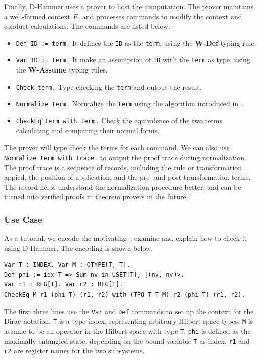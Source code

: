 Finally, D-Hammer uses a prover to host the computation. The prover maintains a well-formed context $E$, and processes commands to modify the context and conduct calculations. The commands are listed below.
\begin{itemize}
    \item \texttt{\textcolor{NavyBlue}{Def} ID := term.} It defines the \texttt{ID} as the \texttt{term}, using the \textbf{W-Def} typing rule.
    \item \texttt{\textcolor{NavyBlue}{Var} ID := term.} It make an assumption of \texttt{ID} with the \texttt{term} as type, using the \textbf{W-Assume} typing rules.
    \item \texttt{\textcolor{NavyBlue}{Check} term.} Type checking the \texttt{term} and output the result.
    \item \texttt{\textcolor{NavyBlue}{Normalize} term.} Normalize the \texttt{term} using the algorithm introduced in~.
    \item \texttt{\textcolor{NavyBlue}{CheckEq} term \textcolor{NavyBlue}{with} term.} Check the equivalence of the two terms calculating and comparing their normal forms.
\end{itemize}
The prover will type check the terms for each command. We can also use \texttt{\textcolor{NavyBlue}{Normalize} term \textcolor{NavyBlue}{with trace}.} to output the proof trace during normalization. The proof trace is a sequence of records, including the rule or transformation appied, the position of application, and the pre- and post-transformation terms. The record helps understand the normalization procedure better, and can be turned into verified proofs in theorem provers in the future.


\subsubsection{Use Case}
As a tutorial, we encode the motivating~, examine and explain how to check it using D-Hammer. The encoding is shown below.

    \begin{lstlisting}[style=dhammer]
Var T : INDEX. Var M : OTYPE[T, T].
Def phi := idx T => Sum nv in USET[T], |(nv, nv)>.
Var r1 : REG[T]. Var r2 : REG[T].
CheckEq M_r1 (phi T)_(r1, r2) with (TPO T T M)_r2 (phi T)_(r1, r2).
    \end{lstlisting}        

The first three lines use the \texttt{\textcolor{NavyBlue}{Var}} and \texttt{\textcolor{NavyBlue}{Def}} commands to set up the context for the Dirac notation.
\texttt{T} is a type index, representing arbitrary Hilbert space types. \texttt{M} is assume to be an operator in the Hilbert space with type \texttt{T}. \texttt{phi} is defined as the maximally entangled state, depending on the bound variable \texttt{T} as index.
\texttt{r1} and \texttt{r2} are register names for the two subsystems.

